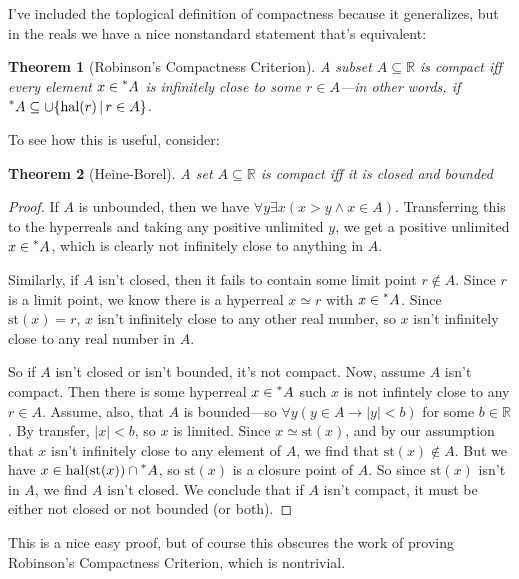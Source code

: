 \documentclass{article}
\newcommand{\st}[1]{\mathrm{st}(#1)}
\newcommand{\hal}[1]{\mathrm{hal}(#1)}
\newcommand{\reals}{\mathbb{R}}
\newcommand{\hr}[1]{\prescript{*}{}{#1}}
\newtheorem*{thm}{Theorem}
\begin{document}
I've included the toplogical definition of compactness because it generalizes, but in the reals we have a nice nonstandard statement that's equivalent:
\begin{thm}[Robinson's Compactness Criterion]
    A subset $A \subseteq \reals$ is compact iff every element $x \in \hr{A}$ is infinitely close to some $r \in A$---in other words, if $\hr{A} \subseteq \cup\{\hal{r} \,|\, r \in A\}$.
\end{thm}

To see how this is useful, consider:
\begin{thm}[Heine-Borel]
    A set $A \subseteq \reals$ is compact iff it is closed and bounded
\end{thm}
\begin{proof}
If $A$ is unbounded, then we have $\forall y \exists x (x > y \land x \in A)$. Transferring this to the hyperreals and taking any positive unlimited $y$, we get a positive unlimited $x \in \hr{A}$, which is clearly not infinitely close to anything in $A$.

Similarly, if $A$ isn't closed, then it fails to contain some limit point $r \notin A$. Since $r$ is a limit point, we know there is a hyperreal $x \simeq r$ with $x \in \hr{A}$. Since $\st{x} = r$, $x$ isn't infinitely close to any other real number, so $x$ isn't infinitely close to any real number in $A$.

So if $A$ isn't closed or isn't bounded, it's not compact. Now, assume $A$ isn't compact. Then there is some hyperreal $x \in \hr{A}$ such $x$ is not infintely close to any $r \in A$. Assume, also, that $A$ is bounded---so $\forall y (y \in A \rightarrow |y| < b)$ for some $b \in \reals$. By transfer, $|x| < b$, so $x$ is limited. Since $x \simeq \st{x}$, and by our assumption that $x$ isn't infinitely close to any element of $A$, we find that $\st{x} \notin A$. But we have $x \in \hal{\st{x}} \cap \hr{A}$, so $\st{x}$ is a closure point of $A$. So since $\st{x}$ isn't in $A$, we find $A$ isn't closed. We conclude that if $A$ isn't compact, it must be either not closed or not bounded (or both).
\end{proof}

This is a nice easy proof, but of course this obscures the work of proving Robinson's Compactness Criterion, which is nontrivial. 
\end{document}

